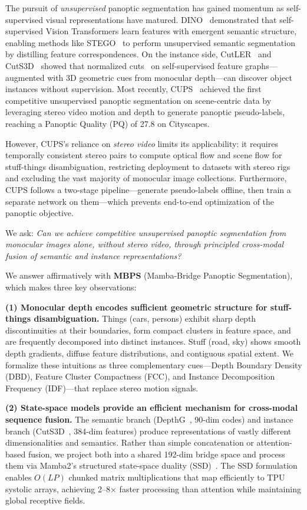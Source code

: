 \documentclass{article}
\begin{document}
The pursuit of \emph{unsupervised} panoptic segmentation has gained momentum as self-supervised visual representations have matured. DINO~\cite{caron2021dino} demonstrated that self-supervised Vision Transformers learn features with emergent semantic structure, enabling methods like STEGO~\cite{hamilton2022stego} to perform unsupervised semantic segmentation by distilling feature correspondences. On the instance side, CutLER~\cite{wang2023cutler} and CutS3D~\cite{sick2025cuts3d} showed that normalized cuts~\cite{shi2000ncut} on self-supervised feature graphs---augmented with 3D geometric cues from monocular depth---can discover object instances without supervision. Most recently, CUPS~\cite{hahn2025cups} achieved the first competitive unsupervised panoptic segmentation on scene-centric data by leveraging stereo video motion and depth to generate panoptic pseudo-labels, reaching a Panoptic Quality (PQ) of 27.8 on Cityscapes.

However, CUPS's reliance on \emph{stereo video} limits its applicability: it requires temporally consistent stereo pairs to compute optical flow and scene flow for stuff-things disambiguation, restricting deployment to datasets with stereo rigs and excluding the vast majority of monocular image collections. Furthermore, CUPS follows a two-stage pipeline---generate pseudo-labels offline, then train a separate network on them---which prevents end-to-end optimization of the panoptic objective.

We ask: \emph{Can we achieve competitive unsupervised panoptic segmentation from monocular images alone, without stereo video, through principled cross-modal fusion of semantic and instance representations?}

We answer affirmatively with \textbf{MBPS} (Mamba-Bridge Panoptic Segmentation), which makes three key observations:

\textbf{(1) Monocular depth encodes sufficient geometric structure for stuff-things disambiguation.} Things (cars, persons) exhibit sharp depth discontinuities at their boundaries, form compact clusters in feature space, and are frequently decomposed into distinct instances. Stuff (road, sky) shows smooth depth gradients, diffuse feature distributions, and contiguous spatial extent. We formalize these intuitions as three complementary cues---Depth Boundary Density (DBD), Feature Cluster Compactness (FCC), and Instance Decomposition Frequency (IDF)---that replace stereo motion signals.

\textbf{(2) State-space models provide an efficient mechanism for cross-modal sequence fusion.} The semantic branch (DepthG~\cite{sick2024depthg}, 90-dim codes) and instance branch (CutS3D~\cite{sick2025cuts3d}, 384-dim features) produce representations of vastly different dimensionalities and semantics. Rather than simple concatenation or attention-based fusion, we project both into a shared 192-dim bridge space and process them via Mamba2's structured state-space duality (SSD)~\cite{dao2024mamba2}. The SSD formulation enables $O(LP)$ chunked matrix multiplications that map efficiently to TPU systolic arrays, achieving 2--8$\times$ faster processing than attention while maintaining global receptive fields.
\end{document}
